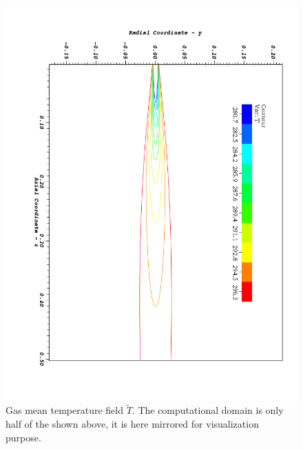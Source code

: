 \clearpage
\begin{figure}
\begin{center}
  \includegraphics[height=0.9\textheight]{./figuras/appA2/visit_T.png}
 \end{center}
 \caption{Gas mean temperature field $\tilde{T}$. The computational domain is only half of the shown above, it is here mirrored for visualization purpose.}
 \label{fig: field_T}
\end{figure}

